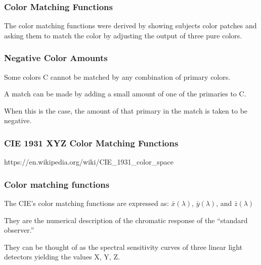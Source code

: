 \documentclass[12pt]{beamer}\usepackage[]{graphicx}\usepackage[]{color}
\begin{document}

\begin{frame}
\frametitle{Color Matching Functions}

The color matching functions were derived by showing subjects color patches 
and asking them to match the color by adjusting the output of three pure colors.
\eb

\end{frame}


\begin{frame}
\frametitle{Negative Color Amounts}

\bbi
  \item Some colors C cannot be matched by any combination of primary colors.
  \item A match can be made by adding a small amount of one of the primaries to C.
  \item When this is the case, the amount of that primary in the match is
  taken to be negative.
\ei

\end{frame}


\begin{frame}
\frametitle{CIE 1931 XYZ Color Matching Functions}
\begin{center}

{\scriptsize {\lolit https://en.wikipedia.org/wiki/CIE\_1931\_color\_space}}
\end{center}
\end{frame}


\begin{frame}
\frametitle{Color matching functions}

\bbi
  \item The CIE's color matching functions are expressed as:
  $\bar{x}(\lambda)$, $\bar{y}(\lambda)$, and $\bar{z}(\lambda)$
  \item They are the numerical description of the chromatic response of the 
  ``standard observer.''
  \item They can be thought of as the spectral sensitivity curves of three 
  linear light detectors yielding the values X, Y, Z.
\ei

\end{frame}
\end{document}
